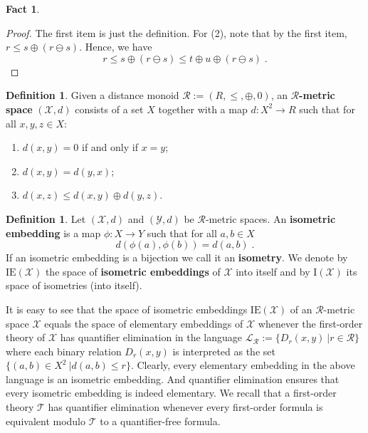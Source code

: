 \documentclass{article}
\newtheorem{fact}[theorem]{Fact}
\theoremstyle{remark}
\theoremstyle{definition}
\newtheorem{definition}[theorem]{Definition}
\renewcommand\leq{\leqslant}
\newcommand{\rr}[0]{\mathcal{R}}
\newcommand{\ie}[0]{\mathrm{IE}}
\begin{document}
{{{{{\begin{fact}
\begin{enumerate}
\end{enumerate}
\end{fact}
\begin{proof} The first item is just the definition. For (2), note that by the first item, $r\leq s\oplus (r\ominus s)$. Hence, we have
\[r\leq s\oplus (r\ominus s)\leq t\oplus u\oplus (r\ominus s)\;.\]
\end{proof}








 
\begin{definition}
Given a distance monoid $\rr:=(R,\leq,\oplus,0)$, an $\bm{\rr}$\textbf{-metric space} $(\mathcal{X},d)$ consists of a set $X$ together with  a  map $d:X^{2}\to R$ such that for all $x,y,z\in X$:
\begin{enumerate}
	\item $d(x,y)=0$ if and only if  $x=y$;
	\item $d(x,y)=d(y,x)$;
	\item $d(x,z)\leq d(x,y)\oplus d(y,z)$.
\end{enumerate}
\end{definition}
\begin{definition}
     Let $(\mathcal{X}, d)$ and $(\mathcal{Y}, d)$ be $\rr$-metric spaces. An \textbf{isometric embedding}
    is a map $\phi:X\to Y$ such that for all $a,b\in X$
 \[d(\phi(a), \phi(b))=d(a,b)\;.\] 
If an isometric embedding is a bijection we call it an \textbf{isometry}. 
We denote by $\ie(\mathcal{X})$ the space of \textbf{isometric embeddings} of $\mathcal{X}$ into itself and by $\mathrm{I}(\mathcal{X})$ its space of isometries (into itself). 
\end{definition}

It is easy to see that the space of isometric embeddings $\ie(\mathcal{X})$ of an $\rr$-metric space $\mathcal{X}$ equals the space of elementary embeddings of $\mathcal{X}$ whenever the first-order theory of $\mathcal{X}$ has quantifier elimination in the language $\mathcal{L}_{\rr}:=\{D_r(x,y)\ \vert r\in\rr\}$ where each binary relation $D_r(x,y)$ is interpreted as the set $\{(a,b)\in X^2\ \vert d(a,b)\leq r\}$. Clearly, every elementary embedding in the above language is an isometric embedding. And quantifier elimination ensures that every isometric embedding is indeed elementary. We recall that a first-order theory $\mathcal{T}$ has quantifier elimination whenever every first-order formula is equivalent modulo $\mathcal{T}$ to a quantifier-free formula. 


}}}}}
\end{document}

